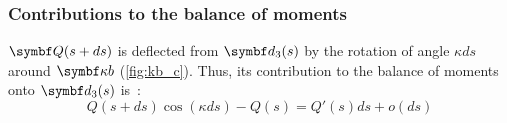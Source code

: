 \subsubsection{Contributions to the balance of moments}
\vspace{10pt}
$\vect{Q}(s+ds)$ is deflected from $\vect{d}_3(s)$ by the rotation of angle $\kappa ds$ around $\vect{\kappa b}$ (\cref{fig:kb_c}). Thus, its contribution to the balance of moments onto $\vect{d}_3(s)$ is~:
\begin{equation*}
	Q(s+ds) \cos(\kappa ds) - Q(s) = Q'(s) ds + o(ds)
\end{equation*}


